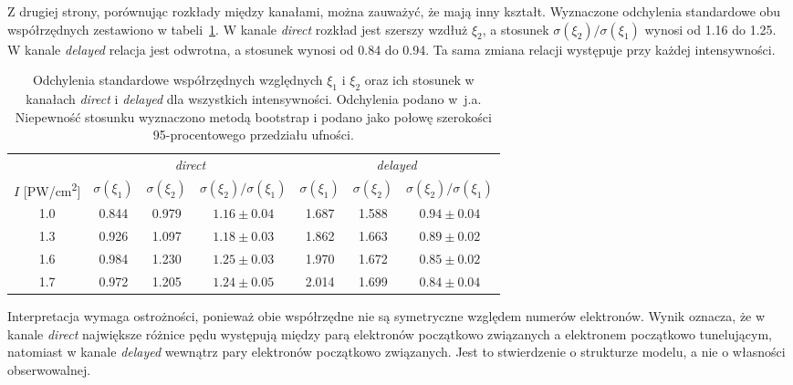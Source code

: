 \documentclass[12pt,a4paper]{article}
\newcommand{\ja}{j.a.}
\newcommand{\PWcm}{PW/cm\textsuperscript{2}}
\begin{document}
Z drugiej strony, porównując rozkłady między kanałami, można zauważyć, że mają inny kształt. Wyznaczone odchylenia standardowe obu współrzędnych zestawiono
w tabeli~\ref{tab:sigmaxi}. W kanale \emph{direct} rozkład jest szerszy
wzdłuż $\xi_2$, a stosunek $\sigma(\xi_2)/\sigma(\xi_1)$ wynosi od
\num{1.16} do \num{1.25}. W kanale \emph{delayed} relacja jest odwrotna,
a stosunek wynosi od \num{0.84} do \num{0.94}. Ta sama zmiana relacji
występuje przy każdej intensywności.

\begin{table}[htbp]
  \centering
  \small
  \setlength{\tabcolsep}{4pt}
  \caption{Odchylenia standardowe współrzędnych względnych $\xi_1$
  i $\xi_2$ oraz ich stosunek w kanałach \emph{direct} i \emph{delayed}
  dla wszystkich intensywności. Odchylenia podano w~\ja{} Niepewność
  stosunku wyznaczono metodą bootstrap i podano jako połowę szerokości
  95-procentowego przedziału ufności.}
  \label{tab:sigmaxi}
  \begin{tabular}{ccccccc}
    \toprule
    & \multicolumn{3}{c}{\emph{direct}} & \multicolumn{3}{c}{\emph{delayed}} \\
    \cmidrule(lr){2-4}\cmidrule(lr){5-7}
    $I$ [\PWcm] & $\sigma(\xi_1)$ & $\sigma(\xi_2)$ & $\sigma(\xi_2)/\sigma(\xi_1)$
                & $\sigma(\xi_1)$ & $\sigma(\xi_2)$ & $\sigma(\xi_2)/\sigma(\xi_1)$ \\
    \midrule
    \num{1.0} & \num{0.844} & \num{0.979} & $\num{1.16}\pm\num{0.04}$ & \num{1.687} & \num{1.588} & $\num{0.94}\pm\num{0.04}$ \\
    \num{1.3} & \num{0.926} & \num{1.097} & $\num{1.18}\pm\num{0.03}$ & \num{1.862} & \num{1.663} & $\num{0.89}\pm\num{0.02}$ \\
    \num{1.6} & \num{0.984} & \num{1.230} & $\num{1.25}\pm\num{0.03}$ & \num{1.970} & \num{1.672} & $\num{0.85}\pm\num{0.02}$ \\
    \num{1.7} & \num{0.972} & \num{1.205} & $\num{1.24}\pm\num{0.05}$ & \num{2.014} & \num{1.699} & $\num{0.84}\pm\num{0.04}$ \\
    \bottomrule
  \end{tabular}
\end{table}

Interpretacja wymaga ostrożności, ponieważ obie współrzędne nie są symetryczne względem numerów elektronów. Wynik oznacza, że w kanale
\emph{direct} największe różnice pędu występują między
parą elektronów początkowo związanych a elektronem
początkowo tunelującym, natomiast w kanale \emph{delayed}
wewnątrz pary elektronów początkowo związanych. Jest to
stwierdzenie o strukturze modelu, a nie o własności obserwowalnej.
\end{document}
